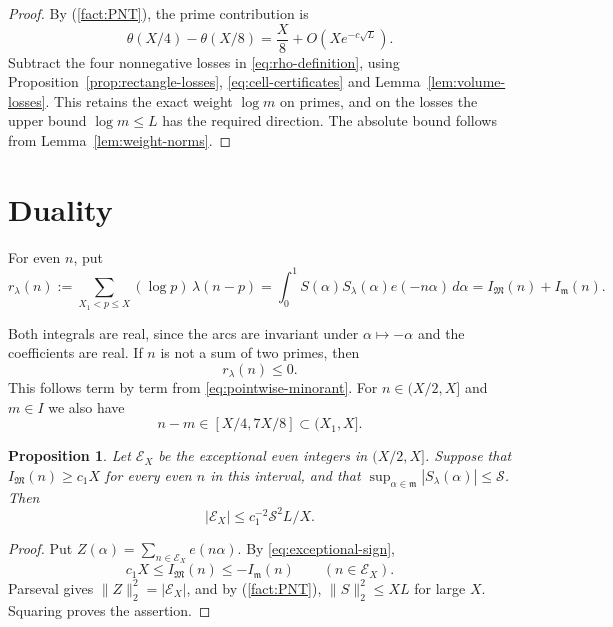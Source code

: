 \documentclass{amsart}
\newtheorem{proposition}[lemma]{Proposition}
\newcounter{fact}
\numberwithin{equation}{section}
\numberwithin{table}{section}
\newcommand{\M}{\mathfrak M}
\newcommand{\m}{\mathfrak m}
\begin{document}
\begin{proof}
By (\ref{fact:PNT}), the prime contribution is
\[
\theta(X/4)-\theta(X/8)
=\frac X8+O\left(Xe^{-c\sqrt L}\right).
\]
Subtract the four nonnegative losses in \eqref{eq:rho-definition}, using
Proposition~\ref{prop:rectangle-losses}, \eqref{eq:cell-certificates}
and Lemma~\ref{lem:volume-losses}. This retains the exact weight $\log m$
on primes, and on the losses the upper bound $\log m\le L$ has the
required direction. The absolute bound follows from
Lemma~\ref{lem:weight-norms}.
\end{proof}

\section{Duality}\label{sec:duality}

For even $n$, put
\begin{equation}
r_\lambda(n):=\sum_{X_1<p\le X}(\log p)\,\lambda(n-p)
=\int_0^1S(\alpha)S_\lambda(\alpha)e(-n\alpha)\,d\alpha
=I_\M(n)+I_\m(n).
\end{equation}

Both integrals are real, since the arcs are invariant under
$\alpha\mapsto-\alpha$ and the coefficients are real.
If $n$ is not a sum of two primes, then
\begin{equation}\label{eq:exceptional-sign}
r_\lambda(n)\le0.
\end{equation}
This follows term by term from \eqref{eq:pointwise-minorant}.
For $n\in(X/2,X]$ and $m\in I$ we also have
\begin{equation}\label{eq:prime-location}
n-m\in[X/4,7X/8]\subset(X_1,X].
\end{equation}

\begin{proposition}\label{prop:duality}
Let $\mathcal E_X$ be the exceptional even integers in $(X/2,X]$.
Suppose that $I_{\M}(n)\ge c_1X$ for every even $n$ in this interval,
and that $\sup_{\alpha\in\m}|S_\lambda(\alpha)|\le\mathcal S$.
Then
\[
|\mathcal E_X|\le c_1^{-2}\mathcal S^2L/X.
\]
\end{proposition}

\begin{proof}
Put $Z(\alpha)=\sum_{n\in\mathcal E_X}e(n\alpha)$.
By \eqref{eq:exceptional-sign},
\[
c_1X\le I_{\M}(n)\le-I_{\m}(n)\qquad(n\in\mathcal E_X).
\]
Parseval gives $\|Z\|_2^2=|\mathcal E_X|$, and by (\ref{fact:PNT}),
$\|S\|_2^2\le XL$ for large $X$. Squaring proves the assertion.
\end{proof}
\end{document}

